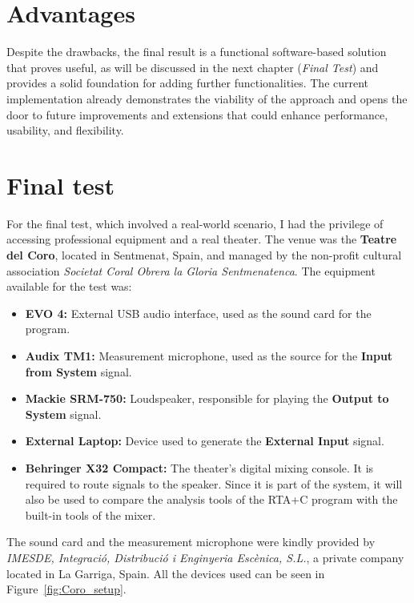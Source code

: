 \section{Advantages}

Despite the drawbacks, the final result is a functional software-based solution that proves useful, as will be discussed in the next chapter (\textit{Final Test}) and provides a solid foundation for adding further functionalities. The current implementation already demonstrates the viability of the approach and opens the door to future improvements and extensions that could enhance performance, usability, and flexibility.

\section{Final test}

For the final test, which involved a real-world scenario, I had the privilege of accessing professional equipment and a real theater. The venue was the \textbf{Teatre del Coro}, located in Sentmenat, Spain, and managed by the non-profit cultural association \textit{Societat Coral Obrera la Gloria Sentmenatenca}. The equipment available for the test was:

\begin{itemize}
	\item \textbf{EVO 4:} External USB audio interface, used as the sound card for the program.
	\item \textbf{Audix TM1:} Measurement microphone, used as the source for the \textbf{Input from System} signal.
	\item \textbf{Mackie SRM-750:} Loudspeaker, responsible for playing the \textbf{Output to System} signal.
	\item \textbf{External Laptop:} Device used to generate the \textbf{External Input} signal.
	\item \textbf{Behringer X32 Compact:} The theater's digital mixing console. It is required to route signals to the speaker. Since it is part of the system, it will also be used to compare the analysis tools of the RTA+C program with the built-in tools of the mixer.
\end{itemize}

The sound card and the measurement microphone were kindly provided by \textit{IMESDE, Integració, Distribució i Enginyeria Escènica, S.L.}, a private company located in La Garriga, Spain. All the devices used can be seen in Figure~\ref{fig:Coro_setup}.

